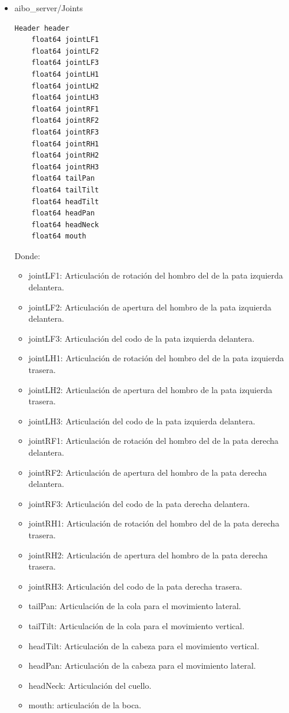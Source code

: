 \documentclass[12pt,a4paper,final,twoside]{book}
\begin{document}
\begin{itemize}
\item aibo{\_}server/Joints
\begin{lstlisting}[language=bash]
	Header header
	float64 jointLF1
	float64 jointLF2     
	float64 jointLF3     
	float64 jointLH1     
	float64 jointLH2 
	float64 jointLH3 
	float64 jointRF1
	float64 jointRF2
	float64 jointRF3
	float64 jointRH1
	float64 jointRH2
	float64 jointRH3
	float64 tailPan
	float64 tailTilt
	float64 headTilt
	float64 headPan
	float64 headNeck
	float64 mouth

\end{lstlisting}

Donde:
\begin{itemize}
\item jointLF1: Articulación de rotación del hombro del de la pata izquierda delantera.
\item jointLF2: Articulación de apertura del hombro de la pata izquierda delantera.
\item jointLF3: Articulación del codo de la pata izquierda delantera.  
\item jointLH1: Articulación de rotación del hombro del de la pata izquierda trasera.     
\item jointLH2: Articulación de apertura del hombro de la pata izquierda trasera.
\item jointLH3: Articulación del codo de la pata izquierda delantera.
\item jointRF1: Articulación de rotación del hombro del de la pata derecha delantera.
\item jointRF2: Articulación de apertura del hombro de la pata derecha delantera.
\item jointRF3: Articulación del codo de la pata derecha delantera.
\item jointRH1: Articulación de rotación del hombro del de la pata derecha trasera.
\item jointRH2: Articulación de apertura del hombro de la pata derecha trasera.
\item jointRH3: Articulación del codo de la pata derecha trasera.
\item tailPan: Articulación de la cola para el movimiento lateral.
\item tailTilt: Articulación de la cola para el movimiento vertical.
\item headTilt: Articulación de la cabeza para el movimiento vertical.
\item headPan: Articulación de la cabeza para el movimiento lateral.
\item headNeck: Articulación del cuello.
\item mouth: articulación de la boca.


\end{itemize}
\end{itemize}
\end{document}
